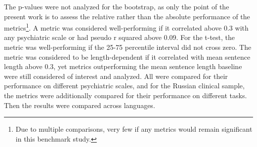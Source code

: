 The p-values were not analyzed for the bootstrap, as only the point of the present work is to assess the relative rather than the absolute performance of the metrics\footnote{Due to multiple comparisons, very few if any metrics would remain significant in this benchmark study.}. A metric was considered well-performing if it correlated above 0.3 with any psychiatric scale or had pseudo r squared above 0.09. For the t-test, the metric was well-performing if the 25-75 percentile interval did not cross zero. The metric was considered to be length-dependent if it correlated with mean sentence length above 0.3, yet metrics outperforming the mean sentence length baseline were still considered of interest and analyzed. All were compared for their performance on different psychiatric scales, and for the Russian clinical sample, the metrics were additionally compared for their performance on different tasks. Then the results were compared across languages.







